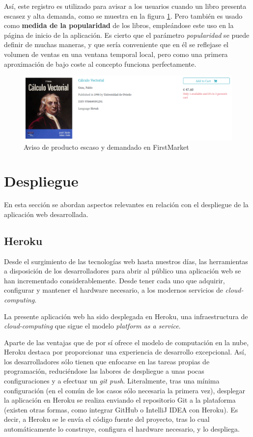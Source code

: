 \documentclass[a4paper,12pt,twoside,openright]{report}
\begin{document}
    Así, este registro es utilizado para avisar a los usuarios cuando un libro presenta escasez y alta demanda, como se muestra en la figura \ref{fig:fm_cartBookRegistry_alert}. Pero también es usado como \textbf{medida de la popularidad} de los libros, empleándose este uso en la página de inicio de la aplicación. Es cierto que el parámetro \emph{popularidad} se puede definir de muchas maneras, y que sería conveniente que en él se reflejase el volumen de ventas en una ventana temporal local, pero como una primera aproximación de bajo coste al concepto funciona perfectamente.
    
    \begin{figure}[htb!]
    	\centering
    	\includegraphics[width=\textwidth]{fm_cartBookRegistry_alert}
    	\caption{Aviso de producto escaso y demandado en FirstMarket}
    	\label{fig:fm_cartBookRegistry_alert}
    \end{figure}
    
    \chapter{Despliegue} \label{sec:deployment}
    En esta sección se abordan aspectos relevantes en relación con el despliegue de la aplicación web desarrollada. 
    
    \section{Heroku} \label{sec:heroku}
    Desde el surgimiento de las tecnologías web hasta nuestros días, las herramientas a disposición de los desarrolladores para abrir al público una aplicación web se han incrementado considerablemente. Desde tener cada uno que adquirir, configurar y mantener el hardware necesario, a los modernos servicios de \emph{cloud-computing}.
    
    La presente aplicación web ha sido desplegada en Heroku, una infraestructura de \emph{cloud-computing} que sigue el modelo \emph{platform as a service}.
    
    Aparte de las ventajas que de por sí ofrece el modelo de computación en la nube, Heroku destaca por proporcionar una experiencia de desarrollo excepcional. Así, los desarrolladores sólo tienen que enfocarse en las tareas propias de programación, reduciéndose las labores de despliegue a unas pocas configuraciones y a efectuar un \emph{git push}. Literalmente, tras una mínima configuración (en el común de los casos sólo necesaria la primera vez), desplegar la aplicación en Heroku se realiza enviando el repositorio Git a la plataforma (existen otras formas, como integrar GitHub o IntelliJ IDEA con Heroku). Es decir, a Heroku se le envía el código fuente del proyecto, tras lo cual automáticamente lo construye, configura el hardware necesario, y lo despliega.
    
\end{document}
